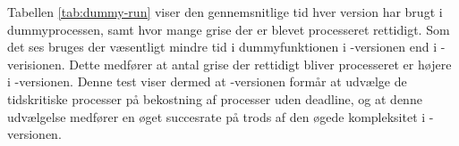 Tabellen \cref{tab:dummy-run} viser den gennemsnitlige tid hver version har brugt i dummyprocessen, samt hvor mange grise der er blevet processeret rettidigt. 
Som det ses bruges der væsentligt mindre tid i dummyfunktionen i -versionen end i -verisionen. Dette medfører at antal grise der rettidigt bliver processeret er højere i -versionen. Denne test viser dermed at -versionen formår at udvælge de tidskritiske processer på bekostning af processer uden deadline, og at denne udvælgelse medfører en øget succesrate på trods af den øgede kompleksitet i -versionen.

